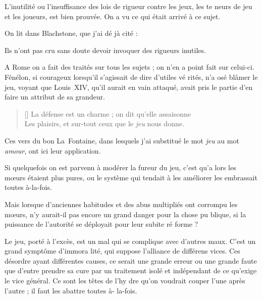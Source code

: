 L'inutilité ou l'insuffisance des lois
de rigueur contre les jeux, les te%
neurs de jeu et les joueurs, est bien
prouvée. On a vu ce qui était arrivé à
ce sujet.

On lit dans Blachstone, que j'ai dé%
jà cité : 

 Ils n'ont pas
cru sans doute devoir invoquer des
rigueurs inutiles.

A Rome on a fait des traités sur
tous les sujets ; on n'en a point fait
sur celui-ci. Fénélon, si courageux
lorsqu'il s'agissait de dire d'utiles vé%
rités, n'a osé blâmer le jeu, voyant
que Louis~XIV, qu'il aurait en vain
attaqué, avait pris le partie d'en faire
un attribut de sa grandeur.

{
  \fontsize{7.2pt}{10.3pt}\selectfont
  \begin{verse}[\versewidth]
    La défense est un charme ; on dit qu'elle assaisonne \\
    Les plaisirs, et sur-tout ceux que le \emph{jeu} nous donne.
  \end{verse}
}

Ces vers du bon La~Fontaine, dans
lesquels j'ai substitué le mot \emph{jeu} au
mot \emph{amour}, ont ici leur application.

Si quelquefois on est parvenu à
modérer la fureur du jeu, c'est qu'a%
lors les mœurs étaient plus pures, ou
le système qui tendait à les améliorer
les embrassait toutes à-la-fois.

Mais lorsque d'anciennes habitudes
et des abus multipliés ont corrompu
les mœurs, n'y aurait-il pas encore
un grand danger pour la chose pu%
blique, si la puissance de l'autorité
se déployait pour leur subite ré%
forme ?

Le jeu, porté à l'excès, est un mal
qui se complique avec d'autres maux.
C'est un grand symptôme d'immora%
lité, qui suppose l'alliance de différens
vices. Ces désordre ayant différentes
causes, ce serait une grande erreur
ou une grande faute que d'entre%
prendre sa cure par un traitement
isolé et indépendant de ce qu'exige le
vice général. Ce sont les têtes de l'hy%
dre qu'on voudrait couper l'une après
l'autre ; il faut les abattre toutes à-%
la-fois.

